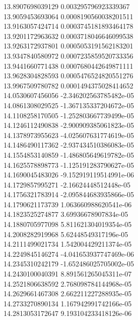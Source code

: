 {13.8907698039129 0.003295796923339367 \\
13.9059453693064 0.0008190560038201511 \\
13.9163057424714 0.0003745181893464178 \\
13.9201172963632 0.0003718046646099538 \\
13.9263172937801 0.0005053191562183201 \\
13.9347840580972 0.0007235859520733356 \\
13.9441660771438 0.0007680442649871111 \\
13.9628304828593 0.0005476524820551276 \\
13.9967509780782 0.0001494375028414652 \\
14.0530607456056 -2.346202563785482e-05 \\
14.0861308029525 -1.367135337204672e-05 \\
14.1108258170505 -1.252803667739499e-05 \\
14.1246112490838 -2.900909385061823e-05 \\
14.1378973955623 -4.025607631774619e-05 \\
14.1486490117362 -2.937434510386083e-05 \\
14.1554853140859 -1.486805649619782e-05 \\
14.1625578898773 -1.125191283790627e-05 \\
14.1690045483026 -9.152919119514991e-06 \\
14.1729857995271 -2.16624448512448e-05 \\
14.1756321783914 -2.095844683935866e-05 \\
14.1790621173739 1.063660988620541e-06 \\
14.1823525274877 3.69936678907834e-05 \\
14.1880705977098 5.811621304019354e-05 \\
14.2008282919968 5.62448549317196e-05 \\
14.2111499021734 1.542004429211374e-05 \\
14.2249845146274 -4.041653937747469e-06 \\
14.2345310242179 -1.652486025705002e-05 \\
14.2430100040391 8.891561265045311e-07 \\
14.2521806638592 2.768098784144968e-05 \\
14.2629661467308 2.662211227288935e-05 \\
14.2733270890134 1.167942991742166e-05 \\
14.2813053172647 9.193104233418126e-06 \\
}
